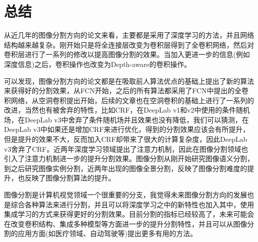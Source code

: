 \documentclass[cn]{elegantbook}
\begin{document}
\chapter{总结}
从近几年的图像分割方向的论文来看，主要都是采用了深度学习的方法，并且网络结构越来越复杂。刚开始只是将全连接层改变为卷积层得到了全卷积网络，然后对卷积层进行了一系列的修改以提高图像分割的效果。当加入更进一步的信息(例如深度信息)之后，卷积操作也改变为Depth-aware的卷积操作。

可以发现，图像分割方向的论文都是在吸取前人算法优点的基础上提出了新的算法来获得好的分割效果，从FCN开始，之后的所有算法都采用了FCN中提出的全卷积网络，从空洞卷积提出开始，后续的文章也在空洞卷积的基础上进行了一系列的改进，当然也有被舍弃的特性，比如CRF，在DeepLab v1和v2中使用的条件随机场，在DeepLab v3中舍弃了条件随机场并且效果也没有降低，我们可以猜测，在DeepLab v3中如果还是增加CRF来进行优化，得到的分割效果应该会有所提升，但是提升的效果不大，反而加入CRF却带来了很大的计算复杂度，因此DeepLab v3舍弃了CRF。近两年深度学习领域提出了注意力机制，因此在图像分割领域也引入了注意力机制进一步的提升分割效果。图像分割从刚开始研究图像语义分割，到之后研究图像实例分割，近两年出现的图像全景分割，反映了图像分割难度的提升，也反映了图像分割算法的提升。

图像分割是计算机视觉领域一个很重要的分支，我觉得未来图像分割方向的发展也是综合各种算法来进行分割，并且可以将深度学习之中的新特性也加入其中，使用集成学习的方式来获得更好的分割效果。目前分割的指标已经较高了，未来可能会在改变卷积结构、集成多种模型等方面进一步的提升分割特性，并且可以从图像分割的应用方面(如医疗领域、自动驾驶等)提出更多有用的方法。



\end{document}
